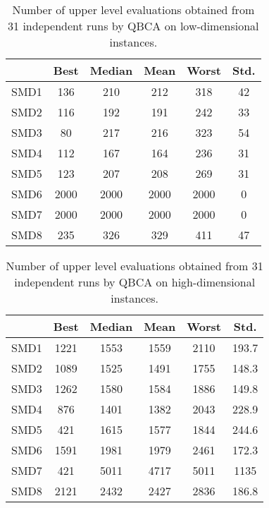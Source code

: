 \documentclass[conference]{IEEEtran}
\theoremstyle{definition}
\begin{document}
\begin{table}[htbp]
    \caption{Number of upper level evaluations obtained from 31 independent runs by QBCA on low-dimensional instances.}
    \label{tab:ul-evals-5}
    \centering
    \begin{tabular}{cccccc}
        \hline
             & Best &  Median &  Mean &  Worst &  Std. \\ \hline
        SMD1 & 136 & 210 & 212 & 318 & 42 \\ \hline 
        SMD2 & 116 & 192 & 191 & 242 & 33 \\ \hline 
        SMD3 & 80 & 217 & 216 & 323 & 54 \\ \hline 
        SMD4 & 112 & 167 & 164 & 236 & 31 \\ \hline 
        SMD5 & 123 & 207 & 208 & 269 & 31 \\ \hline 
        SMD6 & 2000 & 2000 & 2000 & 2000 & 0 \\ \hline 
        SMD7 & 2000 & 2000 & 2000 & 2000 & 0 \\ \hline 
        SMD8 & 235 & 326 & 329 & 411 & 47 \\ \hline 
    \end{tabular}
\end{table}
% 
\begin{table}[htbp]
    \caption{Number of upper level evaluations obtained from 31 independent runs by QBCA on high-dimensional instances.}
    \label{tab:ul-evals}
    \centering
    \begin{tabular}{cccccc}
        \hline
        & Best &  Median &  Mean &  Worst &  Std. \\ \hline
        SMD1 & 1221 & 1553 & 1559 & 2110 & 193.7 \\ \hline 
        SMD2 & 1089 & 1525 & 1491 & 1755 & 148.3 \\ \hline 
        SMD3 & 1262 & 1580 & 1584 & 1886 & 149.8 \\ \hline 
        SMD4 & 876 & 1401 & 1382 & 2043 & 228.9 \\ \hline 
        SMD5 & 421 & 1615 & 1577 & 1844 & 244.6 \\ \hline 
        SMD6 & 1591 & 1981 & 1979 & 2461 & 172.3 \\ \hline 
        SMD7 & 421 & 5011 & 4717 & 5011 & 1135 \\ \hline 
        SMD8 & 2121 & 2432 & 2427 & 2836 & 186.8 \\ \hline 
    \end{tabular}
\end{table}
\end{document}
